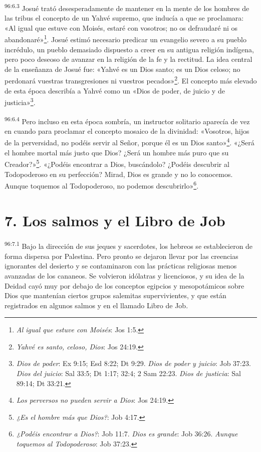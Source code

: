 \par
\textsuperscript{96:6.3} Josué trató desesperadamente de mantener en la mente de los hombres de las tribus el concepto de un Yahvé supremo, que inducía a que se proclamara: «Al igual que estuve con Moisés, estaré con vosotros; no os defraudaré ni os abandonaré»\footnote{\textit{Al igual que estuve con Moisés}: Jos 1:5.}. Josué estimó necesario predicar un evangelio severo a su pueblo incrédulo, un pueblo demasiado dispuesto a creer en su antigua religión indígena, pero poco deseoso de avanzar en la religión de la fe y la rectitud. La idea central de la enseñanza de Josué fue: «Yahvé es un Dios santo; es un Dios celoso; no perdonará vuestras transgresiones ni vuestros pecados»\footnote{\textit{Yahvé es santo, celoso, Dios}: Jos 24:19.}. El concepto más elevado de esta época describía a Yahvé como un «Dios de poder, de juicio y de justicia»\footnote{\textit{Dios de poder}: Ex 9:15; Esd 8:22; Dt 9:29. \textit{Dios de poder y juicio}: Job 37:23. \textit{Dios del juicio}: Sal 33:5; Dt 1:17; 32:4; 2 Sam 22:23. \textit{Dios de justicia}: Sal 89:14; Dt 33:21.}.

\par
\textsuperscript{96:6.4} Pero incluso en esta época sombría, un instructor solitario aparecía de vez en cuando para proclamar el concepto mosaico de la divinidad: «Vosotros, hijos de la perversidad, no podéis servir al Señor, porque él es un Dios santo»\footnote{\textit{Los perversos no pueden servir a Dios}: Jos 24:19.}. «¿Será el hombre mortal más justo que Dios? ¿Será un hombre más puro que su Creador?»\footnote{\textit{¿Es el hombre más que Dios?}: Job 4:17.}. «¿Podéis encontrar a Dios, buscándolo? ¿Podéis descubrir al Todopoderoso en su perfección? Mirad, Dios es grande y no lo conocemos. Aunque toquemos al Todopoderoso, no podemos descubrirlo»\footnote{\textit{¿Podéis encontrar a Dios?}: Job 11:7. \textit{Dios es grande}: Job 36:26. \textit{Aunque toquemos al Todopoderoso}: Job 37:23.}.

\section*{7. Los salmos y el Libro de Job}
\par
\textsuperscript{96:7.1} Bajo la dirección de sus jeques y sacerdotes, los hebreos se establecieron de forma dispersa por Palestina. Pero pronto se dejaron llevar por las creencias ignorantes del desierto y se contaminaron con las prácticas religiosas menos avanzadas de los cananeos. Se volvieron idólatras y licenciosos, y su idea de la Deidad cayó muy por debajo de los conceptos egipcios y mesopotámicos sobre Dios que mantenían ciertos grupos salemitas supervivientes, y que están registrados en algunos salmos y en el llamado Libro de Job.

